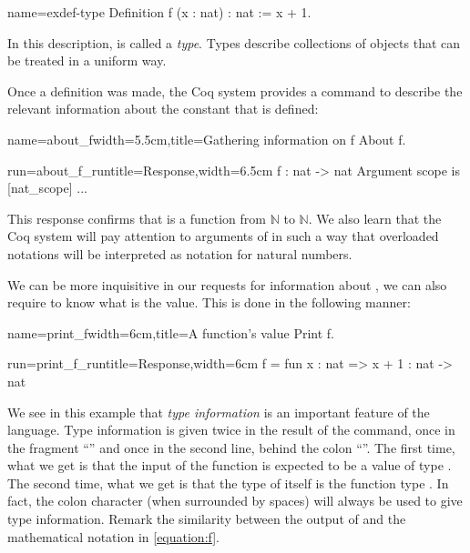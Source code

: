 \begin{coq}{name=exdef-type}{}
Definition f (x : nat) : nat := x + 1.
\end{coq}
In this description,  is called a {\em type}.  Types describe
collections of objects that can be treated in a uniform way.

Once a definition was made, the Coq system provides a command to
describe the relevant information about the constant that is defined:

\begin{coq}{name=about_f}{width=5.5cm,title=Gathering information on f}
About f.
$~$
\end{coq}
\begin{coqout}{run=about_f_run}{title=Response,width=6.5cm}
f : nat -> nat
Argument scope is [nat_scope] ...
\end{coqout}
This response confirms that  is a function from
\({\mathbb{N}}\) to \({\mathbb{N}}\).
We also learn that the Coq system will pay attention to
arguments of  in such a way that overloaded notations
will be interpreted as notation for natural numbers.

We can be more inquisitive in our requests for information about
, we can also require to know what is the value.  This is done in
the following manner:

\begin{coq}{name=print_f}{width=6cm,title=A function's value}
Print f.
$~$
\end{coq}
\begin{coqout}{run=print_f_run}{title=Response,width=6cm}
f = fun x : nat => x + 1
  : nat -> nat
\end{coqout}

We see in this example that {\em type information} is an important
feature of the language.  Type information is given twice in the
result of the  command, once in the fragment ``'' and once in the second line, behind the colon ``\C{:}''.  The first
time, what we get is that the input of the function is expected to be
a value of type .  The second time, what we get is that the
type of  itself is the function type .  In fact,
the colon character (when surrounded by spaces) will always be used to
give type information.  Remark the similarity between the output of 
and the mathematical notation in \eqref{equation:f}.

